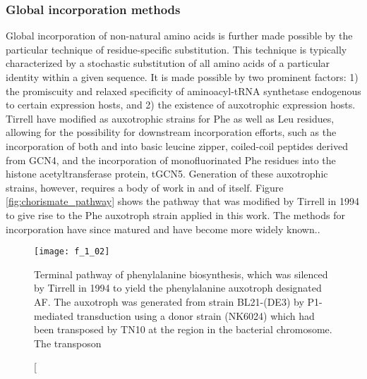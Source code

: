 \begin{refsection}


\subsubsection{Global incorporation methods} 


Global incorporation of non-natural amino acids is further made possible by the
particular technique of residue-specific substitution. This technique is
typically characterized by a stochastic substitution of all amino acids of a
particular identity within a given sequence. It is made possible by two
prominent factors: 1) the promiscuity and relaxed specificity of aminoacyl-tRNA
synthetase endogenous to certain expression hosts, and 2) the existence of
auxotrophic expression hosts. Tirrell  have modified  as auxotrophic strains for Phe as well as Leu residues, allowing for the
possibility for downstream incorporation efforts, such as the incorporation of
both  and
 into basic leucine zipper, coiled-coil
peptides derived from GCN4,\cite{Son2006} and the incorporation of monofluorinated Phe
residues into the histone acetyltransferase protein,
tGCN5.\cite{Voloshchuk2009} Generation of these auxotrophic strains, however,
requires a body of work in and of itself.\cite{Yoshikawa1994,Son2006} Figure
\ref{fig:chorismate_pathway} shows the pathway that was modified by Tirrell
 in 1994 to give rise to the Phe auxotroph strain applied in this
work. The methods for incorporation have since matured and have become more
widely known.\cite{Hammill2007}.
\begin{figure}[h!] \centering \texttt{[image: f\_1\_02]}
    \caption[Terminal pathway
        of phenylalanine biosynthesis, which was silenced by
        Tirrell  in 1994 to yield the phenylalanine auxotroph
        designated AF. The auxotroph was generated from
         strain BL21-(DE3) by P1-mediated transduction using a
        donor strain (NK6024) which had been transposed by TN10 at the
         region in the bacterial chromosome.  The transposon

\end{figure}
\end{refsection}
